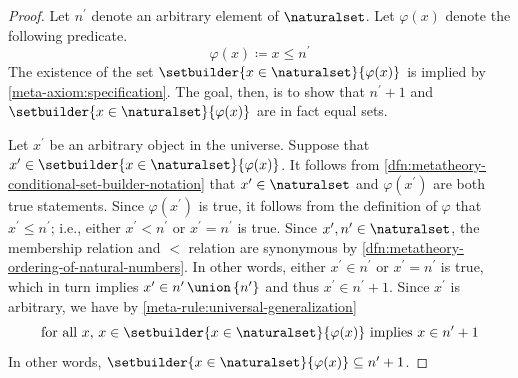 \begin{proof}
    Let \( n^{\prime} \) denote an arbitrary element of \( \naturalset \).
    Let \( \varphi(x) \) denote the following predicate.
    \begin{equation*}
        \varphi(x) \coloneq x \leq n^{\prime}
    \end{equation*}
    The existence of the set \( \setbuilder{x \in \naturalset}{\varphi(x)} \) is implied by \cref{meta-axiom:specification}.
    The goal, then, is to show that \( n^{\prime} + 1 \) and \( \setbuilder{x \in \naturalset}{\varphi(x)} \) are in fact equal sets.

    \vspace{0.3cm}
    \noindent
    Let \( x^{\prime} \) be an arbitrary object in the universe.
    Suppose that \( x^{\prime} \in \setbuilder{x \in \naturalset}{\varphi(x)} \).
    It follows from \cref{dfn:metatheory-conditional-set-builder-notation} that \( x^{\prime} \in \naturalset \) and \( \varphi(x^{\prime}) \)
    are both true statements.
    Since \( \varphi(x^{\prime}) \) is true, it follows from the definition of \( \varphi \) that \( x^{\prime} \leq n^{\prime} \);
    i.e., either \( x^{\prime} < n^{\prime} \) or \( x^{\prime} = n^{\prime} \) is true.
    Since \( x^{\prime}, n^{\prime} \in \naturalset \), the membership relation and \( < \) relation are synonymous by \cref{dfn:metatheory-ordering-of-natural-numbers}.
    In other words, either \( x^{\prime} \in n^{\prime} \) or \( x^{\prime} = n^{\prime} \) is true, which in turn implies \( x^{\prime} \in n^{\prime} \,{\union}\, \mleft\{ n^{\prime} \mright\} \) and thus \( x^{\prime} \in n^{\prime} + 1 \).
    Since \( x^{\prime} \) is arbitrary, we have by \cref{meta-rule:universal-generalization}
    \begin{equation*}
        \text{for all \( x \), \( x \in \setbuilder{x \in \naturalset}{\varphi(x)} \) implies \( x \in n^{\prime} + 1 \)}
    \end{equation*}
    In other words, \( \setbuilder{x \in \naturalset}{\varphi(x)} \subseteq n^{\prime} + 1 \).


\end{proof}
